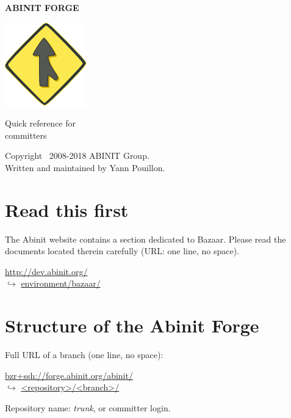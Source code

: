 \documentclass[tumble,foldmark,a4paper]{leaflet}
\begin{document}
\begin{center}
{\Large {\bf ABINIT FORGE}}

\vspace{32mm}

\includegraphics{bzr-logo}

\vspace{24mm}

{\Huge Quick reference for \\[0.5em] committers}

\vspace{40mm}

Copyright \textcopyright\ 2008-2018 ABINIT Group. \\
Written and maintained by Yann Pouillon.
\end{center}

\newpage

\section*{Read this first}

The Abinit website contains a section dedicated to Bazaar. Please read
the documents located therein carefully (URL: one line, no space).
\begin{center}
 \url{http://dev.abinit.org/} \\
 $\hookrightarrow$ \url{environment/bazaar/}
\end{center}

\section*{Structure of the Abinit Forge}

Full URL of a branch (one line, no space):
\begin{center}
 \url{bzr+ssh://forge.abinit.org/abinit/} \\
 $\hookrightarrow$ \url{<repository>/<branch>/}
\end{center}

Repository name: \textit{trunk}, or committer login. \\
\end{document}

